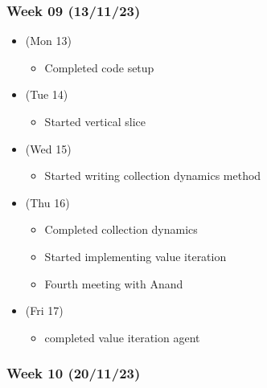 \newpage
\hypertarget{week-09-131123}{%
\subsubsection{Week 09 (13/11/23)}\label{week-09-131123}}

\begin{itemize}
\tightlist
\item
  (Mon 13)

  \begin{itemize}
  \tightlist
  \item
    Completed code setup
  \end{itemize}
\item
  (Tue 14)

  \begin{itemize}
  \tightlist
  \item
    Started vertical slice
  \end{itemize}
\item
  (Wed 15)

  \begin{itemize}
  \tightlist
  \item
    Started writing collection dynamics method
  \end{itemize}
\item
  (Thu 16)

  \begin{itemize}
  \tightlist
  \item
    Completed collection dynamics
  \item
    Started implementing value iteration
  \item
    Fourth meeting with Anand
  \end{itemize}
\item
  (Fri 17)

  \begin{itemize}
  \tightlist
  \item
    completed value iteration agent
  \end{itemize}
\end{itemize}

\hypertarget{week-10-201123}{%
\subsubsection{Week 10 (20/11/23)}\label{week-10-201123}}

